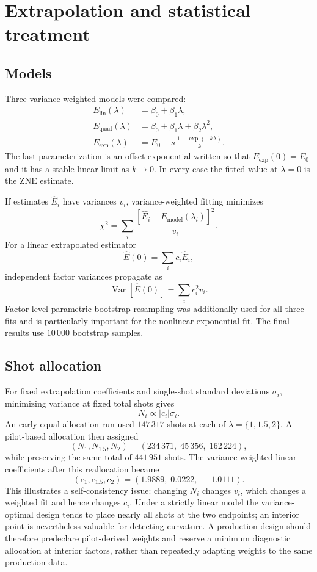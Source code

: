 \documentclass[11pt]{article}
\begin{document}
\section{Extrapolation and statistical treatment}

\subsection{Models}

Three variance-weighted models were compared:
\begin{align}
 E_{\mathrm{lin}}(\lambda)
   &= \beta_0+\beta_1\lambda,\\
 E_{\mathrm{quad}}(\lambda)
   &= \beta_0+\beta_1\lambda+\beta_2\lambda^2,\\
 E_{\mathrm{exp}}(\lambda)
   &= E_0+s\,\frac{1-\exp(-k\lambda)}{k}.
\end{align}
The last parameterization is an offset exponential written so that
$E_{\mathrm{exp}}(0)=E_0$ and it has a stable linear limit as $k\to0$.
In every case the fitted value at $\lambda=0$ is the ZNE estimate.

If estimates $\widehat E_i$ have variances $v_i$, variance-weighted fitting
minimizes
\[
  \chi^2=\sum_i\frac{
    [\widehat E_i-E_{\mathrm{model}}(\lambda_i)]^2}{v_i}.
\]
For a linear extrapolated estimator
\[
  \widehat E(0)=\sum_i c_i\widehat E_i,
\]
independent factor variances propagate as
\[
  \operatorname{Var}[\widehat E(0)]
  =\sum_i c_i^2v_i.
\]
Factor-level parametric bootstrap resampling was additionally used for all
three fits and is particularly important for the nonlinear exponential fit.
The final results use $10\,000$ bootstrap samples.

\subsection{Shot allocation}

For fixed extrapolation coefficients and single-shot standard deviations
$\sigma_i$, minimizing variance at fixed total shots gives
\[
  N_i \propto |c_i|\sigma_i.
\]
An early equal-allocation run used $147\,317$ shots at each of
$\lambda=\{1,1.5,2\}$.  A pilot-based allocation then assigned
\[
  (N_1,N_{1.5},N_2)
  =(234\,371,\;45\,356,\;162\,224),
\]
while preserving the same total of $441\,951$ shots.  The variance-weighted
linear coefficients after this reallocation became
\[
  (c_1,c_{1.5},c_2)
  =(1.9889,\;0.0222,\;-1.0111).
\]
This illustrates a self-consistency issue: changing $N_i$ changes $v_i$,
which changes a weighted fit and hence changes $c_i$.  Under a strictly
linear model the variance-optimal design tends to place nearly all shots at
the two endpoints; an interior point is nevertheless valuable for detecting
curvature.  A production design should therefore predeclare pilot-derived
weights and reserve a minimum diagnostic allocation at interior factors,
rather than repeatedly adapting weights to the same production data.
\end{document}
